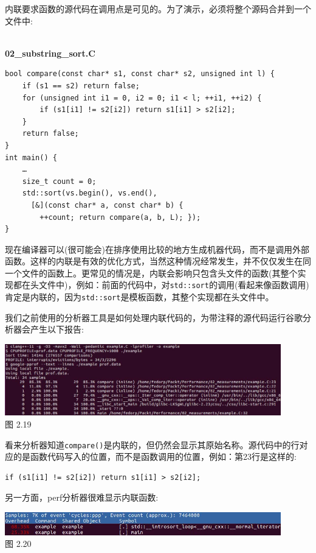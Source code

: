 内联要求函数的源代码在调用点是可见的。为了演示，必须将整个源码合并到一个文件中:

\hspace*{\fill} \\ %
\noindent
\textbf{02\_substring\_sort.C}
\begin{lstlisting}[style=styleCXX]
bool compare(const char* s1, const char* s2, unsigned int l) {
	if (s1 == s2) return false;
	for (unsigned int i1 = 0, i2 = 0; i1 < l; ++i1, ++i2) {
		if (s1[i1] != s2[i2]) return s1[i1] > s2[i2];
	}
	return false;
}
int main() {
	…
	size_t count = 0;
	std::sort(vs.begin(), vs.end(),
	  [&](const char* a, const char* b) {
		++count; return compare(a, b, L); });
}
\end{lstlisting}

现在编译器可以(很可能会)在排序使用比较的地方生成机器代码，而不是调用外部函数。这样的内联是有效的优化方式，当然这种情况经常发生，并不仅仅发生在同一个文件的函数上。更常见的情况是，内联会影响只包含头文件的函数(其整个实现都在头文件中)，例如：前面的代码中，对\texttt{std::sort}的调用(看起来像函数调用)肯定是内联的，因为\texttt{std::sort}是模板函数，其整个实现都在头文件中。

我们之前使用的分析器工具是如何处理内联代码的，为带注释的源代码运行谷歌分析器会产生以下报告:

\begin{center}
\includegraphics[width=0.9\textwidth]{content/1/chapter2/images/19.jpg}\\
图 2.19
\end{center}

看来分析器知道\texttt{compare()}是内联的，但仍然会显示其原始名称。源代码中的行对应的是函数代码写入的位置，而不是函数调用的位置，例如：第23行是这样的:

\begin{lstlisting}[style=styleCXX]
if (s1[i1] != s2[i2]) return s1[i1] > s2[i2];
\end{lstlisting}

另一方面，perf分析器很难显示内联函数:

\begin{center}
\includegraphics[width=0.9\textwidth]{content/1/chapter2/images/20.jpg}\\
图 2.20
\end{center}

